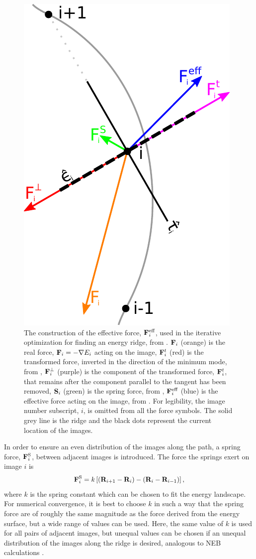 \begin{figure}[t]
\begin{center}
\includegraphics[width=0.5\linewidth]{figures/erm-forces}
\caption{
The construction of the effective force, ${\mathrm{\mathbf{\bm{F}}}}_i^\text{eff}$, used in the iterative optimization for finding an energy ridge, from .
${\mathrm{\mathbf{\bm{F}}}}_i$ (orange) is the real force, ${\mathrm{\mathbf{\bm{F}}}}_i = -\nabla E_i$ acting on the image,
${\mathrm{\mathbf{\bm{F}}}}^t_i$ (red) is the transformed force, inverted in the direction of the minimum mode, from ,
${\mathrm{\mathbf{\bm{F}}}}^\perp_i$ (purple) is the component of the transformed force, ${\mathrm{\mathbf{\bm{F}}}}^t_i$, that remains after the component parallel to the tangent has been removed,
${\mathrm{\mathbf{\bm{S}}}}_i$ (green) is the spring force, from ,
${\mathrm{\mathbf{\bm{F}}}}^\text{eff}_i$ (blue) is the effective force acting on the image, from .
For legibility, the image number subscript, $i$, is omitted from all the force symbols.
The solid grey line is the ridge%
and the black dots represent the current location of the images.}
\label{fig:force-comparison}
\end{center}
\end{figure}

In order to ensure an even distribution of the images along the path, a spring force, ${\mathrm{\mathbf{\bm{F}}}}_i^\text{S}$, between adjacent images is introduced.
The force the springs exert on image $i$ is
\begin{equation}
{\ensuremath{\mathrm{\mathbf{\bm{F}}}}}_i^\text{S} = k \left[ \left( {\mathrm{\mathbf{\bm{R}}}}_{i+1} - {\mathrm{\mathbf{\bm{R}}}}_{i} \right) - \left( {\mathrm{\mathbf{\bm{R}}}}_{i} - {\mathrm{\mathbf{\bm{R}}}}_{i-1} \right) \right],
\label{eq:full-spring-force}
\end{equation}
where $k$ is the spring constant which can be chosen to fit the energy landscape.
For numerical convergence, it is best to choose $k$ in such a way that the spring force are of roughly the same magnitude as the force derived from the energy surface, but a wide range of values can be used.
Here, the same value of $k$ is used for all pairs of adjacent images, but unequal values can be chosen if an unequal distribution of the images along the ridge is desired, analogous to NEB calculations \cite{neb-ci-2000}.

